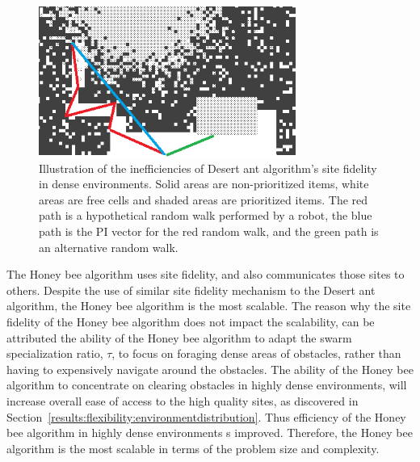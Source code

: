 \begin{figure}[!htb]
\centering
\includegraphics[width=0.75\textwidth]{chapters/chapter6/figures/problem-scalability-desertant.png}
\caption{Illustration of the inefficiencies of Desert ant algorithm's site fidelity in dense environments. Solid areas are non-prioritized items, white areas are free cells and shaded areas are prioritized items. The red path is a hypothetical random walk performed by a robot, the blue path is the PI vector for the red random walk, and the green path is an alternative random walk.}
\label{fig:desertantsitefidelity}
\end{figure}

The Honey bee algorithm uses site fidelity, and also communicates those sites to others. Despite the use of similar site fidelity mechanism to the Desert ant algorithm, the Honey bee algorithm is the most scalable. The reason why the site fidelity of the Honey bee algorithm does not impact the scalability, can be attributed the ability of the Honey bee algorithm to adapt the swarm specialization ratio, $\tau$, to focus on foraging dense areas of obstacles, rather than having to expensively navigate around the obstacles. The ability of the Honey bee algorithm to concentrate on clearing obstacles in highly dense environments, will increase overall ease of access to the high quality sites, as discovered in Section~\ref{results:flexibility:environmentdistribution}. Thus efficiency of the Honey bee algorithm in highly dense environments s improved. Therefore, the Honey bee algorithm is the most scalable in terms of the problem size and complexity.

